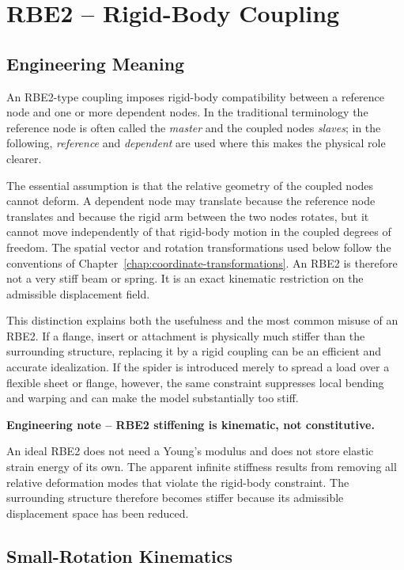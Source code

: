 \section{RBE2 -- Rigid-Body Coupling}\label{sec:rbe2}

\subsection{Engineering Meaning}

An RBE2-type coupling imposes rigid-body compatibility between a reference node
and one or more dependent nodes. In the traditional terminology the reference
node is often called the \textit{master} and the coupled nodes \textit{slaves};
in the following, \textit{reference} and \textit{dependent} are used where this
makes the physical role clearer.

The essential assumption is that the relative geometry of the coupled nodes
cannot deform. A dependent node may translate because the reference node
translates and because the rigid arm between the two nodes rotates, but it cannot
move independently of that rigid-body motion in the coupled degrees of freedom.
The spatial vector and rotation transformations used below follow the conventions
of Chapter~\ref{chap:coordinate-transformations}. An RBE2 is therefore not a
very stiff beam or spring. It is an exact kinematic restriction on the admissible
displacement field.

This distinction explains both the usefulness and the most common misuse of an
RBE2. If a flange, insert or attachment is physically much stiffer than the
surrounding structure, replacing it by a rigid coupling can be an efficient and
accurate idealization. If the spider is introduced merely to spread a load over a
flexible sheet or flange, however, the same constraint suppresses local bending
and warping and can make the model substantially too stiff.

\begin{bbox}
\textbf{Engineering note -- RBE2 stiffening is kinematic, not constitutive.}

An ideal RBE2 does not need a Young's modulus and does not store elastic strain
energy of its own. The apparent infinite stiffness results from removing all
relative deformation modes that violate the rigid-body constraint. The
surrounding structure therefore becomes stiffer because its admissible
displacement space has been reduced.
\end{bbox}

\subsection{Small-Rotation Kinematics}

